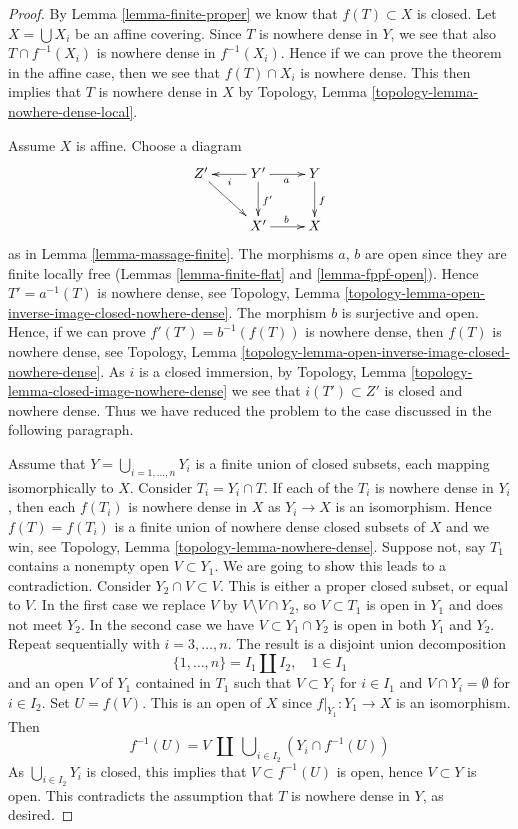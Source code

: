 \begin{proof}
By Lemma \ref{lemma-finite-proper} we know that $f(T) \subset X$ is closed.
Let $X = \bigcup X_i$ be an affine covering.
Since $T$ is nowhere dense in $Y$, we see that also $T \cap f^{-1}(X_i)$
is nowhere dense in $f^{-1}(X_i)$. Hence if we can prove the theorem in the
affine case, then we see that $f(T) \cap X_i$ is nowhere dense.
This then implies that $T$ is nowhere dense in $X$ by
Topology, Lemma \ref{topology-lemma-nowhere-dense-local}.

\medskip\noindent
Assume $X$ is affine. Choose a diagram
$$
\xymatrix{
Z' \ar[rd] &
Y' \ar[l]^i \ar[d]^{f'} \ar[r]_a &
Y \ar[d]^f \\
 & X' \ar[r]^b & X
}
$$
as in Lemma \ref{lemma-massage-finite}. The morphisms $a$, $b$ are
open since they are finite locally free
(Lemmas \ref{lemma-finite-flat} and \ref{lemma-fppf-open}).
Hence $T' = a^{-1}(T)$ is nowhere dense, see
Topology, Lemma \ref{topology-lemma-open-inverse-image-closed-nowhere-dense}.
The morphism $b$ is surjective and open.
Hence, if we can prove $f'(T') = b^{-1}(f(T))$ is
nowhere dense, then $f(T)$ is nowhere dense, see
Topology, Lemma \ref{topology-lemma-open-inverse-image-closed-nowhere-dense}.
As $i$ is a closed immersion, by
Topology, Lemma \ref{topology-lemma-closed-image-nowhere-dense}
we see that $i(T') \subset Z'$ is closed and nowhere dense.
Thus we have reduced the problem to the case discussed
in the following paragraph.

\medskip\noindent
Assume that $Y = \bigcup_{i = 1, \ldots, n} Y_i$ is a finite union of
closed subsets, each mapping isomorphically to $X$. Consider
$T_i = Y_i \cap T$. If each of the $T_i$ is nowhere dense in $Y_i$,
then each $f(T_i)$ is nowhere dense in $X$ as $Y_i \to X$ is an isomorphism.
Hence $f(T) = f(T_i)$ is a finite union of nowhere dense closed
subsets of $X$ and we win, see
Topology, Lemma \ref{topology-lemma-nowhere-dense}.
Suppose not, say $T_1$ contains a nonempty open $V \subset Y_1$.
We are going to show this leads to a contradiction.
Consider $Y_2 \cap V \subset V$. This is either
a proper closed subset, or equal to $V$. In the first case we replace
$V$ by $V \setminus V \cap Y_2$, so $V \subset T_1$ is open in $Y_1$ and
does not meet $Y_2$. In the second case we have
$V \subset Y_1 \cap Y_2$ is open in both $Y_1$ and $Y_2$.
Repeat sequentially with $i = 3, \ldots, n$. The result is a disjoint
union decomposition
$$
\{1, \ldots, n\} = I_1 \coprod I_2,\quad 1 \in I_1
$$
and an open $V$ of $Y_1$ contained in $T_1$ such that $V \subset Y_i$
for $i \in I_1$ and $V \cap Y_i = \emptyset$ for $i \in I_2$. Set
$U = f(V)$. This is an open of $X$ since $f|_{Y_1} : Y_1 \to X$ is
an isomorphism. Then
$$
f^{-1}(U) = V\ \coprod\ \bigcup\nolimits_{i \in I_2} (Y_i \cap f^{-1}(U))
$$
As $\bigcup_{i \in I_2} Y_i$ is closed, this implies that
$V \subset f^{-1}(U)$ is open, hence $V \subset Y$ is open.
This contradicts the assumption that $T$ is nowhere dense in $Y$, as desired.
\end{proof}


